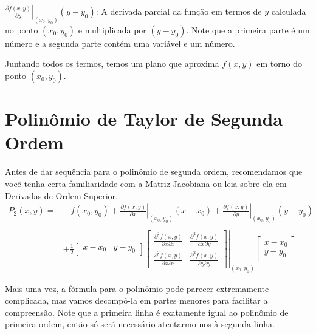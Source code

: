 \documentclass[
  portuguese,
  letterpaper,
  DIV=11,
  numbers=noendperiod]{scrreport}
\begin{document}
\(\left. \frac{\partial f(x,y)}{\partial y} \right |_{(x_0,y_0)} (y-y_0)\):
A derivada parcial da função em termos de \(y\) calculada no ponto
\((x_0, y_0)\) e multiplicada por \((y-y_0)\). Note que a primeira parte
é um número e a segunda parte contém uma variável e um número.

Juntando todos os termos, temos um plano que aproxima \(f(x,y)\) em
torno do ponto \((x_0, y_0)\).

\section{Polinômio de Taylor de Segunda
Ordem}\label{polinuxf4mio-de-taylor-de-segunda-ordem}

Antes de dar sequência para o polinômio de segunda ordem, recomendamos
que você tenha certa familiaridade com a Matriz Jacobiana ou leia sobre
ela em \href{(d-simples.qmd)}{Derivadas de Ordem Superior}. \[
\begin{aligned}
P_2(x,y) = & \phantom{;;} f(x_0, y_0) + 
\left. \frac{\partial f(x,y)}{\partial x} \right |_{(x_0,y_0)} (x-x_0) +
\left. \frac{\partial f(x,y)}{\partial y} \right |_{(x_0,y_0)} (y-y_0) \\ \\
& + \frac{1}{2} \begin{bmatrix} x-x_0 & y-y_0 \end{bmatrix}
\left. \begin{bmatrix} \frac{\partial^2 f(x,y)}{\partial x\partial x} & \frac{\partial^2 f(x,y)}{\partial x\partial y}\\ 
                \frac{\partial^2f(x,y)}{\partial x\partial x} & \frac{\partial^2 f(x,y)}{\partial y \partial y} \end{bmatrix}\right |_{(x_0,y_0)}
\begin{bmatrix} x-x_0 \\ y-y_0 \end{bmatrix}
\end{aligned}
\]

Mais uma vez, a fórmula para o polinômio pode parecer extremamente
complicada, mas vamos decompô-la em partes menores para facilitar a
compreensão. Note que a primeira linha é exatamente igual ao polinômio
de primeira ordem, então só será necessário atentarmo-nos à segunda
linha.
\end{document}
